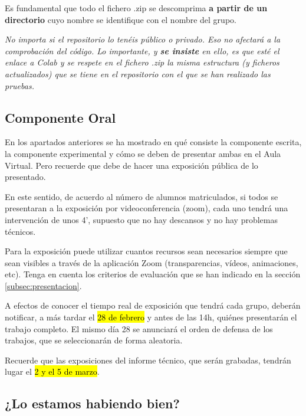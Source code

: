 \documentclass[a4paper, 11pt]{article}
\begin{document}
\begin{importantbox}
Es fundamental que todo el fichero .zip se descomprima \textbf{\color{red}a partir de un directorio} cuyo nombre se identifique con el nombre del grupo.
\end{importantbox}

 \textit{No importa si el repositorio lo tenéis público o privado. Eso no afectará a la comprobación del código. Lo importante, y \textbf{se insiste} en ello, es que esté el enlace a Colab y se respete en el fichero .zip la misma estructura (y ficheros actualizados) que se tiene en el repositorio con el que se han realizado las pruebas.}


\subsection{Componente Oral}

En los apartados anteriores se ha mostrado en qué consiste la componente escrita, la componente experimental y cómo se deben de presentar ambas en el Aula Virtual. Pero recuerde que debe de hacer una exposición pública de lo presentado. 

En este sentido, de acuerdo al número de alumnos matriculados, si todos se presentaran a la exposición por videoconferencia (zoom), cada uno tendrá una intervención de unos 4', supuesto que no hay descansos y no hay problemas técnicos.

Para la exposición puede utilizar cuantos recursos sean necesarios siempre que sean visibles a través de la aplicación Zoom (transparencias, vídeos, animaciones, etc). Tenga en cuenta los criterios de evaluación que se han indicado en la sección \ref{subsec:presentacion}.


\begin{importantbox}
A efectos de conocer el tiempo real de exposición que tendrá cada grupo, deberán notificar, a más tardar el \hl{28 de febrero} y antes de las 14h, quiénes presentarán el trabajo completo. El mismo día 28 se anunciará el orden de defensa de los trabajos, que se seleccionarán de forma aleatoria.

Recuerde que las exposiciones del informe técnico, que serán grabadas, tendrán lugar el \hl{2 y el 5 de marzo}.
\end{importantbox}



\subsection{¿Lo estamos habiendo bien?}
\end{document}
